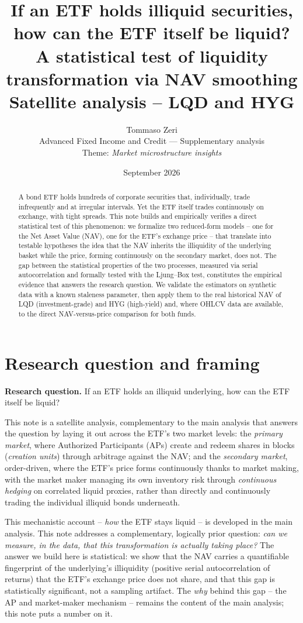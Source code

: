 \documentclass[11pt]{article}
\title{\Large If an ETF holds illiquid securities, how can the ETF itself be liquid?\\[4pt]
\large A statistical test of liquidity transformation via NAV smoothing\\[2pt]
\normalsize Satellite analysis -- LQD and HYG}
\author{Tommaso Zeri \\ \small Advanced Fixed Income and Credit --- Supplementary analysis \\ \small Theme: \emph{Market microstructure insights}}
\date{September 2026}
\begin{document}
\maketitle

\begin{abstract}
\noindent A bond ETF holds hundreds of corporate securities that, individually, trade infrequently and at irregular intervals. Yet the ETF itself trades continuously on exchange, with tight spreads. This note builds and empirically verifies a direct statistical test of this phenomenon: we formalize two reduced-form models -- one for the Net Asset Value (NAV), one for the ETF's exchange price -- that translate into testable hypotheses the idea that the NAV inherits the illiquidity of the underlying basket while the price, forming continuously on the secondary market, does not. The gap between the statistical properties of the two processes, measured via serial autocorrelation and formally tested with the Ljung--Box test, constitutes the empirical evidence that answers the research question. We validate the estimators on synthetic data with a known staleness parameter, then apply them to the real historical NAV of LQD (investment-grade) and HYG (high-yield) and, where OHLCV data are available, to the direct NAV-versus-price comparison for both funds.
\end{abstract}

\section{Research question and framing}
\label{sec:rq}

\textbf{Research question.} If an ETF holds an illiquid underlying, how can the ETF itself be liquid?

This note is a satellite analysis, complementary to the main analysis that answers the question by laying it out across the ETF's two market levels: the \emph{primary market}, where Authorized Participants (APs) create and redeem shares in blocks (\emph{creation units}) through arbitrage against the NAV; and the \emph{secondary market}, order-driven, where the ETF's price forms continuously thanks to market making, with the market maker managing its own inventory risk through \emph{continuous hedging} on correlated liquid proxies, rather than directly and continuously trading the individual illiquid bonds underneath.

This mechanistic account -- \emph{how} the ETF stays liquid -- is developed in the main analysis. This note addresses a complementary, logically prior question: \emph{can we measure, in the data, that this transformation is actually taking place?} The answer we build here is statistical: we show that the NAV carries a quantifiable fingerprint of the underlying's illiquidity (positive serial autocorrelation of returns) that the ETF's exchange price does not share, and that this gap is statistically significant, not a sampling artifact. The \emph{why} behind this gap -- the AP and market-maker mechanism -- remains the content of the main analysis; this note puts a number on it.
\end{document}
